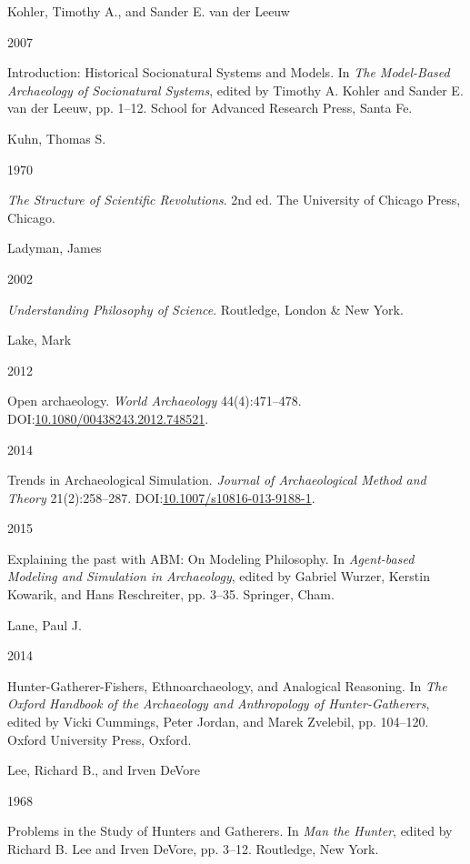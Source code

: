 \documentclass[
  12pt,
  a4paper,
  oneside]{book}
\newlength{\cslhangindent}
\newlength{\csllabelwidth}
\newlength{\cslentryspacingunit} %
\newenvironment{CSLReferences}[2] %
 {%
  \setlength{\parindent}{0pt}
  \ifodd #1
  \let\oldpar\par
  \def\par{\hangindent=\cslhangindent\oldpar}
  \fi
  \setlength{\parskip}{#2\cslentryspacingunit}
 }%
 {}
\newcommand{\CSLBlock}[1]{#1\hfill\break}
\newcommand{\CSLLeftMargin}[1]{\parbox[t]{\csllabelwidth}{#1}}
\newcommand{\CSLRightInline}[1]{\parbox[t]{\linewidth - \csllabelwidth}{#1}\break}
\begin{document}
\begin{CSLReferences}{0}{0}
\leavevmode{}%
\CSLBlock{Kohler, Timothy A., and Sander E. van der Leeuw}
\CSLLeftMargin{ 2007}
\CSLRightInline{{Introduction: Historical Socionatural Systems and Models}. In \emph{{The Model-Based Archaeology of Socionatural Systems}}, edited by Timothy A. Kohler and Sander E. van der Leeuw, pp. 1--12. School for Advanced Research Press, Santa Fe.}

\leavevmode{}%
\CSLBlock{Kuhn, Thomas S.}
\CSLLeftMargin{ 1970}
\CSLRightInline{\emph{{The Structure of Scientific Revolutions}}. 2nd ed. The University of Chicago Press, Chicago.}

\leavevmode{}%
\CSLBlock{Ladyman, James}
\CSLLeftMargin{ 2002}
\CSLRightInline{\emph{{Understanding Philosophy of Science}}. Routledge, London \& New York.}

\leavevmode{}%
\CSLBlock{Lake, Mark}
\CSLLeftMargin{ 2012}
\CSLRightInline{{Open archaeology}. \emph{World Archaeology} 44(4):471--478. DOI:\href{https://doi.org/10.1080/00438243.2012.748521}{10.1080/00438243.2012.748521}.}

\leavevmode{}%
\CSLLeftMargin{ 2014 }
\CSLRightInline{{Trends in Archaeological Simulation}. \emph{Journal of Archaeological Method and Theory} 21(2):258--287. DOI:\href{https://doi.org/10.1007/s10816-013-9188-1}{10.1007/s10816-013-9188-1}.}

\leavevmode{}%
\CSLLeftMargin{ 2015 }
\CSLRightInline{{Explaining the past with ABM: On Modeling Philosophy}. In \emph{{Agent-based Modeling and Simulation in Archaeology}}, edited by Gabriel Wurzer, Kerstin Kowarik, and Hans Reschreiter, pp. 3--35. Springer, Cham.}

\leavevmode{}%
\CSLBlock{Lane, Paul J.}
\CSLLeftMargin{ 2014}
\CSLRightInline{{Hunter-Gatherer-Fishers, Ethnoarchaeology, and Analogical Reasoning}. In \emph{{The Oxford Handbook of the Archaeology and Anthropology of Hunter-Gatherers}}, edited by Vicki Cummings, Peter Jordan, and Marek Zvelebil, pp. 104--120. Oxford University Press, Oxford.}

\leavevmode{}%
\CSLBlock{Lee, Richard B., and Irven DeVore}
\CSLLeftMargin{ 1968}
\CSLRightInline{{Problems in the Study of Hunters and Gatherers}. In \emph{{Man the Hunter}}, edited by Richard B. Lee and Irven DeVore, pp. 3--12. Routledge, New York.}


\end{CSLReferences}
\end{document}
